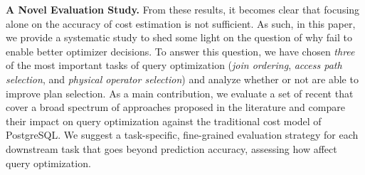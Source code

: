 \noindent\textbf{A Novel Evaluation Study.}
From these results, it becomes clear that focusing alone on the accuracy of cost estimation is not sufficient.
As such, in this paper, we provide a systematic study to shed some light on the question of why \lcms fail to enable better optimizer decisions.
To answer this question, we have chosen \textit{three} of the most important tasks of query optimization (\textit{join ordering}, \textit{access path selection}, and \textit{physical operator selection}) and analyze whether or not \lcms are able to improve plan selection.
As a main contribution, we evaluate a set of recent \lcms that cover a broad spectrum of approaches proposed in the literature and compare their impact on query optimization against the traditional cost model of PostgreSQL.
We suggest a task-specific, fine-grained evaluation strategy for each downstream task that goes beyond prediction accuracy, assessing how \lcms affect query optimization.

